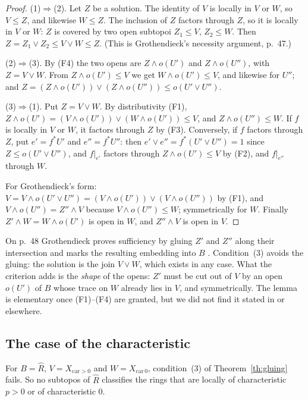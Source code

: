 \begin{proof}
(1)$\Rightarrow$(2). Let $Z$ be a solution. The identity of $V$ is locally in $V$ or $W$, so $V\le Z$, and likewise $W\le Z$. The inclusion of $Z$ factors through $Z$, so it is locally in $V$ or $W$: $Z$ is covered by two open subtopoi $Z_1\le V$, $Z_2\le W$. Then $Z = Z_1\vee Z_2\le V\vee W\le Z$. (This is Grothendieck's necessity argument, p.~47.)

(2)$\Rightarrow$(3). By (F4) the two opens are $Z\wedge o(U')$ and $Z\wedge o(U'')$, with $Z = V\vee W$. From $Z\wedge o(U')\le V$ we get $W\wedge o(U')\le V$, and likewise for $U''$; and $Z = (Z\wedge o(U'))\vee(Z\wedge o(U''))\le o(U'\vee U'')$.

(3)$\Rightarrow$(1). Put $Z = V\vee W$. By distributivity (F1), $Z\wedge o(U') = (V\wedge o(U'))\vee(W\wedge o(U'))\le V$, and $Z\wedge o(U'')\le W$. If $f$ is locally in $V$ or $W$, it factors through $Z$ by (F3). Conversely, if $f$ factors through $Z$, put $e' = f^*U'$ and $e'' = f^*U''$: then $e'\vee e'' = f^*(U'\vee U'') = 1$ since $Z\le o(U'\vee U'')$, and $f|_{e'}$ factors through $Z\wedge o(U')\le V$ by (F2), and $f|_{e''}$ through $W$.

For Grothendieck's form: $V = V\wedge o(U'\vee U'') = (V\wedge o(U'))\vee(V\wedge o(U''))$ by (F1), and $V\wedge o(U'') = Z''\wedge V$ because $V\wedge o(U'')\le W$; symmetrically for $W$. Finally $Z'\wedge W = W\wedge o(U')$ is open in $W$, and $Z''\wedge V$ is open in $V$.
\end{proof}

\begin{remark}
On p.~48 Grothendieck proves sufficiency by gluing $Z'$ and $Z''$ along their intersection and marks the resulting embedding into $B$ . Condition~(3) avoids the gluing: the solution is the join $V\vee W$, which exists in any case. What the criterion adds is the \emph{shape} of the opens: $Z'$ must be cut out of $V$ by an open $o(U')$ of $B$ whose trace on $W$ already lies in $V$, and symmetrically. The lemma is elementary once (F1)--(F4) are granted, but we did not find it stated in \cite{elephant} or elsewhere.
\end{remark}

\subsection{The case of the characteristic}

\begin{proposition}\label{prop:nocar}
For $B = \widehat R$, $V = X_{\mathrm{car}>0}$ and $W = X_{\mathrm{car}\,0}$, condition~(3) of Theorem~\ref{th:gluing} fails. So no subtopos of $\widehat R$ classifies the rings that are locally of characteristic $p>0$ or of characteristic $0$.
\end{proposition}


